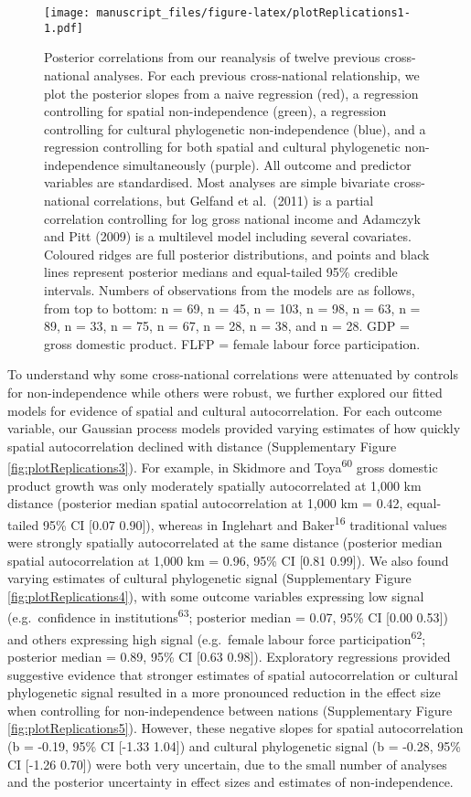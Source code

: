 \documentclass[
  man,floatsintext]{apa6}
\begin{document}
\begin{figure}
\centering
\texttt{[image: manuscript\_files/figure-latex/plotReplications1-1.pdf]}
\caption{\label{fig:plotReplications1}Posterior correlations from our reanalysis of twelve previous cross-national analyses. For each previous cross-national relationship, we plot the posterior slopes from a naive regression (red), a regression controlling for spatial non-independence (green), a regression controlling for cultural phylogenetic non-independence (blue), and a regression controlling for both spatial and cultural phylogenetic non-independence simultaneously (purple). All outcome and predictor variables are standardised. Most analyses are simple bivariate cross-national correlations, but Gelfand et al.~(2011) is a partial correlation controlling for log gross national income and Adamczyk and Pitt (2009) is a multilevel model including several covariates. Coloured ridges are full posterior distributions, and points and black lines represent posterior medians and equal-tailed 95\% credible intervals. Numbers of observations from the models are as follows, from top to bottom: n = 69, n = 45, n = 103, n = 98, n = 63, n = 89, n = 33, n = 75, n = 67, n = 28, n = 38, and n = 28. GDP = gross domestic product. FLFP = female labour force participation.}
\end{figure}

To understand why some cross-national correlations were attenuated by controls for non-independence while others were robust, we further explored our fitted models for evidence of spatial and cultural autocorrelation. For each outcome variable, our Gaussian process models provided varying estimates of how quickly spatial autocorrelation declined with distance (Supplementary Figure \ref{fig:plotReplications3}). For example, in Skidmore and Toya\textsuperscript{60} gross domestic product growth was only moderately spatially autocorrelated at 1,000 km distance (posterior median spatial autocorrelation at 1,000 km = 0.42, equal-tailed 95\% CI {[}0.07 0.90{]}), whereas in Inglehart and Baker\textsuperscript{16} traditional values were strongly spatially autocorrelated at the same distance (posterior median spatial autocorrelation at 1,000 km = 0.96, 95\% CI {[}0.81 0.99{]}). We also found varying estimates of cultural phylogenetic signal (Supplementary Figure \ref{fig:plotReplications4}), with some outcome variables expressing low signal (e.g.~confidence in institutions\textsuperscript{63}; posterior median = 0.07, 95\% CI {[}0.00 0.53{]}) and others expressing high signal (e.g.~female labour force participation\textsuperscript{62}; posterior median = 0.89, 95\% CI {[}0.63 0.98{]}). Exploratory regressions provided suggestive evidence that stronger estimates of spatial autocorrelation or cultural phylogenetic signal resulted in a more pronounced reduction in the effect size when controlling for non-independence between nations (Supplementary Figure \ref{fig:plotReplications5}). However, these negative slopes for spatial autocorrelation (b = -0.19, 95\% CI {[}-1.33 1.04{]}) and cultural phylogenetic signal (b = -0.28, 95\% CI {[}-1.26 0.70{]}) were both very uncertain, due to the small number of analyses and the posterior uncertainty in effect sizes and estimates of non-independence.
\end{document}
